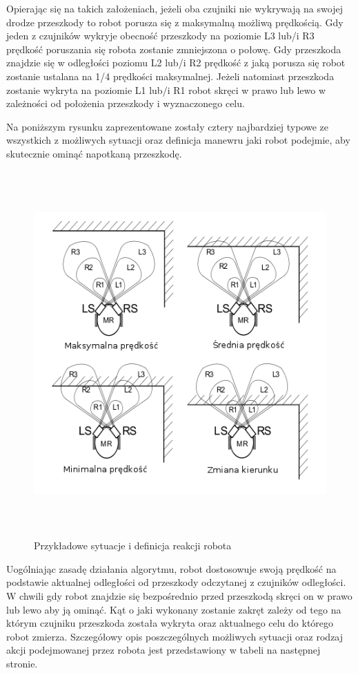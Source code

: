 Opierając się na takich założeniach, jeżeli oba czujniki nie
wykrywają na swojej drodze przeszkody to robot porusza się z maksymalną możliwą
prędkością. Gdy jeden z czujników wykryje obecność przeszkody na poziomie  L3
lub/i R3 prędkość poruszania się robota zostanie zmniejszona o połowę. Gdy
przeszkoda znajdzie się w odległości poziomu L2 lub/i R2 prędkość z jaką porusza
się robot zostanie ustalana na 1/4 prędkości maksymalnej. Jeżeli natomiast
przeszkoda zostanie wykryta na poziomie L1 lub/i R1 robot skręci w prawo lub lewo
w zależności od położenia przeszkody i wyznaczonego celu.

Na poniższym rysunku zaprezentowane zostały cztery najbardziej typowe ze
wszystkich z możliwych sytuacji oraz definicja manewru jaki robot
podejmie, aby skutecznie ominąć napotkaną przeszkodę. 

\begin{figure}[h!]
 \centering
 \includegraphics[height=140mm]{../images/ch04/obs_avoid_algorithm.png}
 \caption{Przykładowe sytuacje i definicja reakcji robota}
 \label{fig:IRSensorPosition}
\end{figure}

Uogólniając zasadę działania algorytmu, robot dostosowuje swoją prędkość na
podstawie aktualnej odległości od przeszkody odczytanej z czujników odległości.
W chwili gdy robot znajdzie się bezpośrednio przed przeszkodą skręci on w prawo
lub lewo aby ją ominąć. Kąt o jaki wykonany zostanie zakręt zależy od tego na
którym czujniku przeszkoda została wykryta oraz aktualnego celu do którego robot
zmierza. Szczegółowy opis poszczególnych możliwych sytuacji oraz rodzaj akcji
podejmowanej przez robota jest przedstawiony w tabeli na następnej stronie. 

